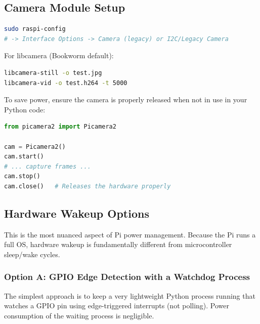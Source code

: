 \documentclass[11pt,letter]{article}
\begin{document}
\subsection{Camera Module Setup}

\begin{lstlisting}[language=bash, caption={Enable camera interface}]
sudo raspi-config
# -> Interface Options -> Camera (legacy) or I2C/Legacy Camera
\end{lstlisting}

For libcamera (Bookworm default):
\begin{lstlisting}[language=bash, caption={Test camera capture with libcamera}]
libcamera-still -o test.jpg
libcamera-vid -o test.h264 -t 5000
\end{lstlisting}

To save power, ensure the camera is properly released when not in use in your Python code:
\begin{lstlisting}[language=python, caption={Proper camera resource management in Python}]
from picamera2 import Picamera2

cam = Picamera2()
cam.start()
# ... capture frames ...
cam.stop()
cam.close()   # Releases the hardware properly
\end{lstlisting}

\subsection{Hardware Wakeup Options}
\label{sec:hardware_wakeup}

This is the most nuanced aspect of Pi power management. Because the Pi runs a full OS, hardware wakeup is fundamentally different from microcontroller sleep/wake cycles.

\subsubsection{Option A: GPIO Edge Detection with a Watchdog Process}

The simplest approach is to keep a very lightweight Python process running that watches a GPIO pin using edge-triggered interrupts (not polling). Power consumption of the waiting process is negligible.
\end{document}
